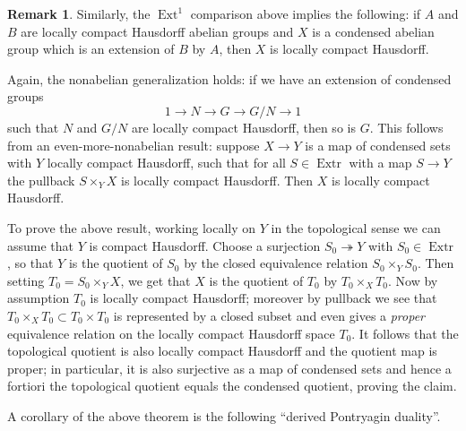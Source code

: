 \documentclass[12pt]{article}
\theoremstyle{definition}
\newtheorem{remark}[theorem]{Remark}
\newcommand{\on}{\operatorname}
\begin{document}
\begin{remark}
Similarly, the $\on{Ext}^1$ comparison above implies the following: if $A$ and $B$ are locally compact Hausdorff abelian groups and $X$ is a condensed abelian group which is an extension of $B$ by $A$, then $X$ is locally compact Hausdorff.

Again, the nonabelian generalization holds: if we have an extension of condensed groups
$$1 \to N \to G \to G/N \to 1$$
such that $N$ and $G/N$ are locally compact Hausdorff, then so is $G$.  This follows from an even-more-nonabelian result: suppose $X\to Y$ is a map of condensed sets with $Y$ locally compact Hausdorff, such that for all $S\in\on{Extr}$ with a map $S\to Y$ the pullback $S\times_YX$ is locally compact Hausdorff.  Then $X$ is locally compact Hausdorff.

To prove the above result, working locally on $Y$ in the topological sense we can assume that $Y$ is compact Hausdorff.  Choose a surjection $S_0\twoheadrightarrow Y$ with $S_0\in\on{Extr}$, so that $Y$ is the quotient of $S_0$ by the closed equivalence relation $S_0\times_Y S_0$.  Then setting $T_0=S_0\times_YX$, we get that $X$ is the quotient of $T_0$ by $T_0\times_X T_0$.  Now by assumption $T_0$ is locally compact Hausdorff; moreover by pullback we see that $T_0\times_XT_0\subset T_0\times T_0$ is represented by a closed subset and even gives a \emph{proper} equivalence relation on the locally compact Hausdorff space $T_0$.  It follows that the topological quotient is also locally compact Hausdorff and the quotient map is proper; in particular, it is also surjective as a map of condensed sets and hence a fortiori the topological quotient equals the condensed quotient, proving the claim.
\end{remark}

A corollary of the above theorem is the following ``derived Pontryagin duality''.
\end{document}
